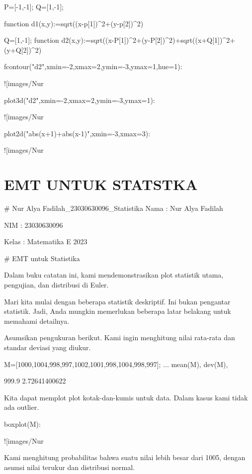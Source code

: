 \documentclass{article}
\begin{document}
\>P=[-1,-1]; Q=[1,-1];

\>function d1(x,y):=sqrt((x-p[1])^2+(y-p[2])^2)

\>Q=[1,-1]; function d2(x,y):=sqrt((x-P[1])^2+(y-P[2])^2)+sqrt((x+Q[1])^2+(y+Q[2])^2)

\>fcontour("d2",xmin=-2,xmax=2,ymin=-3,ymax=1,hue=1):


![images/Nur%

\>plot3d("d2",xmin=-2,xmax=2,ymin=-3,ymax=1):


![images/Nur%

\>plot2d("abs(x+1)+abs(x-1)",xmin=-3,xmax=3):


![images/Nur%

\section{EMT UNTUK STATSTKA}
# Nur Alya Fadilah_23030630096_Statistika
Nama  : Nur Alya Fadilah


NIM   : 23030630096


Kelas : Matematika E 2023


# EMT untuk Statistika

Dalam buku catatan ini, kami mendemonstrasikan plot statistik utama,
pengujian, dan distribusi di Euler.


Mari kita mulai dengan beberapa statistik deskriptif. Ini bukan
pengantar statistik. Jadi, Anda mungkin memerlukan beberapa latar
belakang untuk memahami detailnya.


Asumsikan pengukuran berikut. Kami ingin menghitung nilai rata-rata
dan standar deviasi yang diukur.


\>M=[1000,1004,998,997,1002,1001,998,1004,998,997]; ...  
\>   mean(M), dev(M),


    999.9
    2.72641400622

Kita dapat memplot plot kotak-dan-kumis untuk data. Dalam kasus kami
tidak ada outlier.


\>boxplot(M):


![images/Nur%

Kami menghitung probabilitas bahwa suatu nilai lebih besar dari 1005,
dengan asumsi nilai terukur dan distribusi normal.
\end{document}
